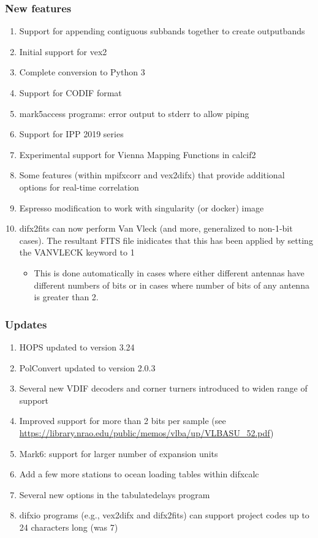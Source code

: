 \subsubsection{New features}
\begin{enumerate}
\item Support for appending contiguous subbands together to create outputbands
\item Initial support for vex2
\item Complete conversion to Python 3
\item Support for CODIF format
\item mark5access programs: error output to stderr to allow piping
\item Support for IPP 2019 series
\item Experimental support for Vienna Mapping Functions in calcif2
\item Some features (within mpifxcorr and vex2difx) that provide additional options for real-time correlation
\item Espresso modification to work with singularity (or docker) image
\item difx2fits can now perform Van Vleck (and more, generalized to non-1-bit cases).  The resultant FITS file inidicates that this has been applied by setting the VANVLECK keyword to 1
\begin{itemize}
  \item This is done automatically in cases where either different antennas have different numbers of bits or in cases where number of bits of any antenna is greater than 2.
\end{itemize}
\end{enumerate}

\subsubsection{Updates}
\begin{enumerate}
\item HOPS updated to version 3.24
\item PolConvert updated to version 2.0.3
\item Several new VDIF decoders and corner turners introduced to widen range of support
\item Improved support for more than 2 bits per sample (see \url{https://library.nrao.edu/public/memos/vlba/up/VLBASU_52.pdf})
\item Mark6: support for larger number of expansion units
\item Add a few more stations to ocean loading tables within difxcalc
\item Several new options in the tabulatedelays program
\item difxio programs (e.g., vex2difx and difx2fits) can support project codes up to 24 characters long (was 7)
\end{enumerate}

